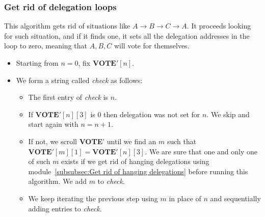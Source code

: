 \documentclass[submission, copyright,creativecommons,sharealike,noncommercial]{eptcs}
\newcommand{\Vote}{\textbf{VOTE}\xspace}
\begin{document}
\subsubsection{Get rid of delegation loops}\label{subsubsec:Get rid of delegation loops}
	This algorithm gets rid of situations like $A \to B \to C \to A$. It proceeds looking for such situation, and if it finds one, it sets all the delegation addresses in the loop to zero, meaning that $A,B,C$ will vote for themselves.
	\begin{itemize}
		\item Starting from $n=0$, fix $\Vote'[n]$. 
		\item We form a string called \emph{check} as follows:
		\begin{itemize}
			\item The first entry of \emph{check} is $n$.
			
			\item If $\Vote'[n][3]$ is $0$ then delegation was not set for $n$. We skip and start again with $n = n+1$.

			\item If not, we scroll \Vote' until we find an $m$ such that $\Vote'[m][1] = \Vote'[n][3]$. We are sure that one and only one of such $m$ exists if we get rid of hanging delegations using module~\ref{subsubsec:Get rid of hanging delegations} before running this algorithm. We add $m$ to \emph{check}.
			
			\item We keep iterating the previous step using $m$ in place of $n$ and sequentially adding entries to \emph{check}. 
			

\end{itemize}
\end{itemize}
\end{document}
